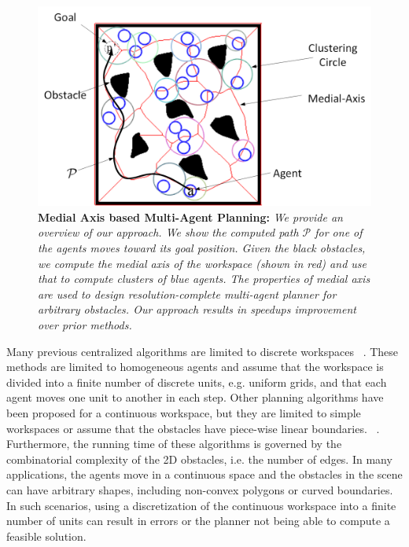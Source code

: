 \begin{figure}[!ht]
\centering
\includegraphics[width=0.8
\linewidth]{figs/Overview.png}
\caption{{\bf Medial Axis based Multi-Agent Planning:} {\em  We provide an overview of our approach. We show the computed path $\mathcal{P}$ for one of the agents moves toward its goal position. Given the black obstacles, we compute the medial axis of the workspace (shown in red) and use that to compute clusters of blue agents. The properties of medial axis are used to design resolution-complete multi-agent planner for arbitrary obstacles. Our approach results in speedups improvement over prior methods.}}
\vspace*{-0.1in}
\label{fig:overview}
\end{figure}
Many previous centralized algorithms are limited to discrete workspaces ~\cite{katsev2013efficient,luna2011push}.
These methods are limited to homogeneous agents and assume that the workspace is divided into a finite number of discrete units, e.g. uniform grids, and that each agent moves one unit to another in each step. Other planning algorithms have been proposed for a continuous workspace, but they are limited to simple workspaces or assume that the obstacles have piece-wise linear boundaries.  ~\cite{turpin2013goal,krontiris2013feasibility,karamouzas2013space,turpin2013trajectory,turpin2013concurrent}. Furthermore, the running time of these algorithms is governed by the combinatorial complexity of the 2D obstacles, i.e. the number of edges.
In many applications, the agents move in a continuous space and the obstacles in the scene can have arbitrary shapes, including non-convex polygons or curved boundaries. In such scenarios, using a discretization of the continuous workspace into a finite number of units can result in errors or the planner not being able to compute a feasible solution.  

